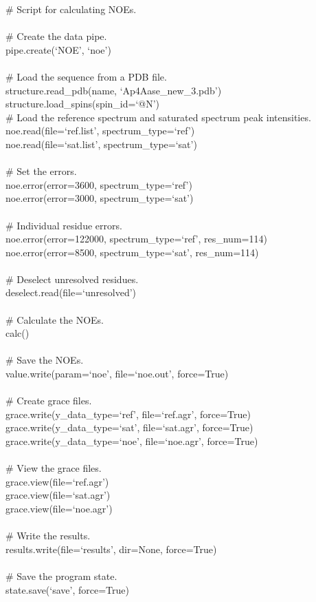 \begin{exampleenv}
\# Script for calculating NOEs. \\
 \\
\# Create the data pipe. \\
pipe.create(`NOE', `noe') \\
 \\
\# Load the sequence from a PDB file. \\
structure.read\_pdb(name, `Ap4Aase\_new\_3.pdb') \\
structure.load\_spins(spin\_id=`@N')
 \\
\# Load the reference spectrum and saturated spectrum peak intensities. \\
noe.read(file=`ref.list', spectrum\_type=`ref') \\
noe.read(file=`sat.list', spectrum\_type=`sat') \\
 \\
\# Set the errors. \\
noe.error(error=3600, spectrum\_type=`ref') \\
noe.error(error=3000, spectrum\_type=`sat') \\
 \\
\# Individual residue errors. \\
noe.error(error=122000, spectrum\_type=`ref', res\_num=114) \\
noe.error(error=8500, spectrum\_type=`sat', res\_num=114) \\
 \\
\# Deselect unresolved residues. \\
deselect.read(file=`unresolved') \\
 \\
\# Calculate the NOEs. \\
calc() \\
 \\
\# Save the NOEs. \\
value.write(param=`noe', file=`noe.out', force=True) \\
 \\
\# Create grace files. \\
grace.write(y\_data\_type=`ref', file=`ref.agr', force=True) \\
grace.write(y\_data\_type=`sat', file=`sat.agr', force=True) \\
grace.write(y\_data\_type=`noe', file=`noe.agr', force=True) \\
 \\
\# View the grace files. \\
grace.view(file=`ref.agr') \\
grace.view(file=`sat.agr') \\
grace.view(file=`noe.agr') \\
 \\
\# Write the results. \\
results.write(file=`results', dir=None, force=True) \\
 \\
\# Save the program state. \\
state.save(`save', force=True)
\end{exampleenv}



